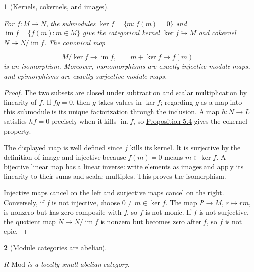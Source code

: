 \documentclass[11pt,a4paper]{article}
\newcommand{\mathheading}{}
\theoremstyle{plain}
\newtheorem*{plainstatement}{\mathheading}
\theoremstyle{definition}
\newenvironment{mathstatement}[3]{\renewcommand{\mathheading}{#1 #2}\begin{plainstatement}[#3]}{\end{plainstatement}}
\begin{document}
\begin{mathstatement}{Proposition}{5.5}{Kernels, cokernels, and images}
\label{env-5-5}

For \(f:M\to N\), the submodules \(\ker f=\{m:f(m)=0\}\) and \(\operatorname{im}f=\{f(m):m\in M\}\) give the categorical kernel \(\ker f\hookrightarrow M\) and cokernel \(N\twoheadrightarrow N/\operatorname{im}f\). The canonical map

 \[M/\ker f\longrightarrow\operatorname{im}f,\qquad m+\ker f\longmapsto f(m)\] 
is an isomorphism. Moreover, monomorphisms are exactly injective module maps, and epimorphisms are exactly surjective module maps.


\par{}\par

\end{mathstatement}
 
\begin{proof}

The two subsets are closed under subtraction and scalar multiplication by linearity of \(f\). If \(fg=0\), then \(g\) takes values in \(\ker f\); regarding \(g\) as a map into this submodule is its unique factorization through the inclusion. A map \(h:N\to L\) satisfies \(hf=0\) precisely when it kills \(\operatorname{im}f\), so \hyperref[env-5-4]{Proposition 5.4} gives the cokernel property.


The displayed map is well defined since \(f\) kills its kernel. It is surjective by the definition of image and injective because \(f(m)=0\) means \(m\in\ker f\). A bijective linear map has a linear inverse: write elements as images and apply its linearity to their sums and scalar multiples. This proves the isomorphism.


Injective maps cancel on the left and surjective maps cancel on the right. Conversely, if \(f\) is not injective, choose \(0\ne m\in\ker f\). The map \(R\to M\), \(r\mapsto rm\), is nonzero but has zero composite with \(f\), so \(f\) is not monic. If \(f\) is not surjective, the quotient map \(N\to N/\operatorname{im}f\) is nonzero but becomes zero after \(f\), so \(f\) is not epic.


\end{proof}
 
\begin{mathstatement}{Theorem}{5.6}{Module categories are abelian}
\label{env-5-6}

\(R\text{-}\mathrm{Mod}\) is a locally small abelian category.


\par{}\par

\end{mathstatement}
 
\end{document}
